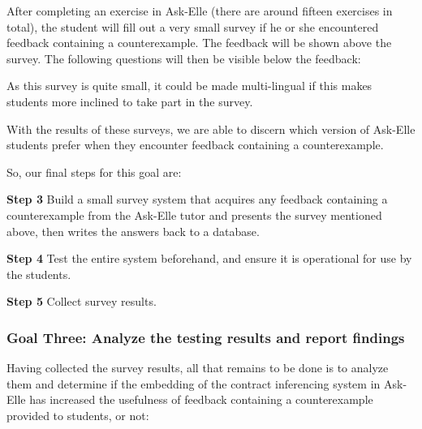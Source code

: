 \documentclass[10pt,a4paper]{article}
\begin{document}
After completing an exercise in Ask-Elle (there are around fifteen exercises in total), the student will fill out a very small survey if he or she encountered feedback containing a counterexample.
The feedback will be shown above the survey.
The following questions will then be visible below the feedback:


As this survey is quite small, it could be made multi-lingual if this makes students more inclined to take part in the survey.

With the results of these surveys, we are able to discern which version of Ask-Elle students prefer when they encounter feedback containing a counterexample.

So, our final steps for this goal are:

\begin{description}
	\item{\textbf{Step 3}} Build a small survey system that acquires any feedback containing a counterexample from the Ask-Elle tutor and presents the survey mentioned above, then writes the answers back to a database.
	\item{\textbf{Step 4}} Test the entire system beforehand, and ensure it is operational for use by the students.
	\item{\textbf{Step 5}} Collect survey results.
\end{description}

\subsubsection{Goal Three: Analyze the testing results and report findings}

Having collected the survey results, all that remains to be done is to analyze them and determine if the embedding of the contract inferencing system in Ask-Elle has increased the usefulness of feedback containing a counterexample provided to students, or not:
\end{document}
